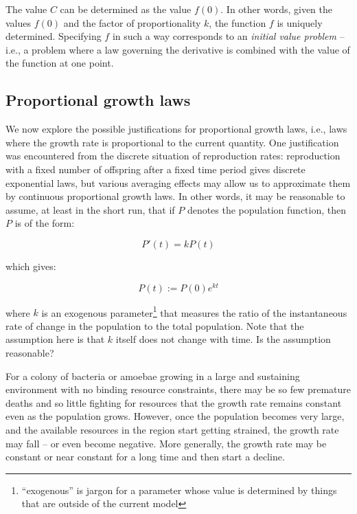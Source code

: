 \documentclass{amsart}
\begin{document}
The value $C$ can be determined as the value $f(0)$. In other words,
given the values $f(0)$ and the factor of proportionality $k$, the
function $f$ is uniquely determined. Specifying $f$ in such a way
corresponds to an {\em initial value problem} -- i.e., a problem where
a law governing the derivative is combined with the value of the
function at one point.

\subsection{Proportional growth laws}

We now explore the possible justifications for proportional growth
laws, i.e., laws where the growth rate is proportional to the current
quantity. One justification was encountered from the discrete
situation of reproduction rates: reproduction with a fixed number of
offspring after a fixed time period gives discrete exponential laws,
but various averaging effects may allow us to approximate them by
continuous proportional growth laws. In other words, it may be
reasonable to assume, at least in the short run, that if $P$ denotes
the population function, then $P$ is of the form:

$$P'(t) = kP(t)$$

which gives:

$$P(t) := P(0)e^{kt}$$

where $k$ is an exogenous parameter\footnote{``exogenous'' is jargon
for a parameter whose value is determined by things that are outside
of the current model} that measures the ratio of the instantaneous rate
of change in the population to the total population. Note that the
assumption here is that $k$ itself does not change with time. Is the
assumption reasonable?

For a colony of bacteria or amoebae growing in a large and sustaining
environment with no binding resource constraints, there may be so few
premature deaths and so little fighting for resources that the growth
rate remains constant even as the population grows. However, once the
population becomes very large, and the available resources in the
region start getting strained, the growth rate may fall -- or even
become negative. More generally, the growth rate may be constant or
near constant for a long time and then start a decline.
\end{document}
